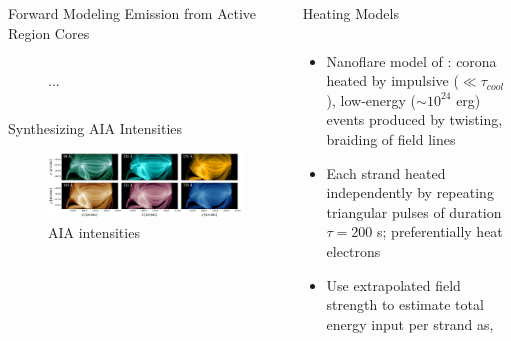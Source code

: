 \documentclass[final]{beamer}
\begin{document}
\begin{frame}
\begin{columns}[T]
\begin{column}{0.49\linewidth}
\begin{block}{Forward Modeling Emission from Active Region Cores}
\begin{columns}[T]
\begin{column}{0.49\columnwidth}
\begin{figure}
                \caption{...}
                \label{fig:response_functions}
            \end{figure}
        \end{column}
        \begin{column}{0.49\columnwidth}
        \end{column}
    \end{columns}
    \end{block}
    \begin{block}{Synthesizing AIA Intensities}
        \vspace{-2ex}
        \begin{figure}
            \includegraphics[width=\columnwidth]{figures/aia_intensities.pdf}
            \caption{AIA intensities} 
            \label{fig:synthesized_aia_maps}
            \centering
        \end{figure}
    \end{block}
  \end{column}
  \begin{column}{0.49\linewidth}
    \begin{block}{Heating Models}
        \begin{columns}[T]
        \begin{column}{0.49\columnwidth}
            \begin{itemize}
            \item Nanoflare model of \citet{parker_nanoflares_1988}: corona heated by impulsive ($\ll\tau_{cool}$), low-energy ($\sim10^{24}$ erg) events produced by twisting, braiding of field lines
            \item Each strand heated independently by repeating triangular pulses of duration $\tau=200$ s; preferentially heat electrons 
            \item Use extrapolated field strength to estimate total energy input per strand as,

\end{itemize}
\end{column}
\end{columns}
\end{block}
\end{column}
\end{columns}
\end{frame}
\end{document}
